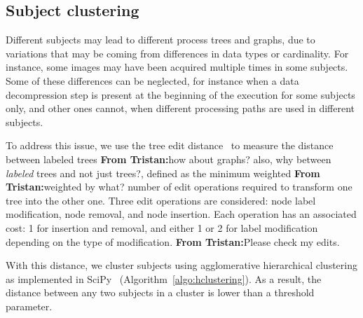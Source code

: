 \documentclass[a4paper,num-refs]{oup-contemporary}
\newcommand{\tristan}[1]{\color{blue}\textbf{From Tristan:}#1\color{black}}
\begin{document}
\subsection{Subject clustering}

Different subjects may lead to different process trees and graphs, due to
variations that may be coming from differences in data types or
cardinality. For instance, some images may have been acquired multiple
times in some subjects. Some of these differences can be neglected, for
instance when a data decompression step is present at the beginning of the
execution for some subjects only, and other ones cannot, when different
processing paths are used in different subjects.

To address this issue, we use the tree edit distance~\cite{zhang1989simple}
to measure the distance between labeled trees \tristan{how about graphs?
also, why between \emph{labeled} trees and not just trees?}, defined as the
minimum weighted \tristan{weighted by what?} number of edit operations
required to transform one tree into the other one. Three edit operations
are considered: node label modification, node removal, and node insertion.
Each operation has an associated cost: 1 for insertion and removal, and
either 1 or 2 for label modification depending on the type of modification. \tristan{Please check my edits.}

With this distance, we cluster subjects using agglomerative hierarchical
clustering as implemented in SciPy~\cite{oliphant2007scipy}
(Algorithm~\ref{algo:hclustering}). As a result, the distance between
any two subjects in a cluster is lower than a threshold parameter.
\end{document}
